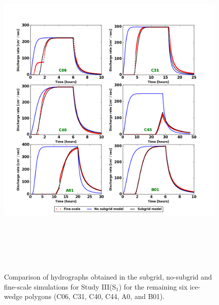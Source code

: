\documentclass[review,11pt]{elsarticle}
\begin{document}
\begin{figure}
\centering
\includegraphics[width=13.2cm, height=17cm]{./figures/new-model/all-polygons-hydrograph.png}
\caption{Comparison of hydrographs obtained in the subgrid, no-subgrid and fine-scale simulations for Study III(S$_1$) for the remaining six ice-wedge polygons (C06, C31, C40, C44, A0, and B01).}
\label{all-polygons-hydrographs}
\end{figure}
\end{document}
